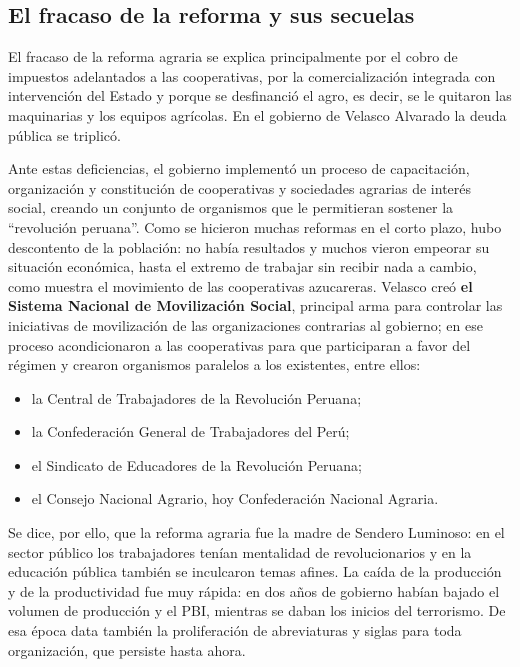 \documentclass[
  man,
  floatsintext,
  longtable,
  a4paper,
  nolmodern,
  notxfonts,
  notimes,
  12pt,
  colorlinks=true,linkcolor=blue,citecolor=blue,urlcolor=blue]{apa7}
\providecommand{\tightlist}{%
  \setlength{\itemsep}{0pt}\setlength{\parskip}{0pt}}
\begin{document}
\subsection{El fracaso de la reforma y sus
secuelas}\label{el-fracaso-de-la-reforma-y-sus-secuelas}

El fracaso de la reforma agraria se explica principalmente por el cobro
de impuestos adelantados a las cooperativas, por la comercialización
integrada con intervención del Estado y porque se desfinanció el agro,
es decir, se le quitaron las maquinarias y los equipos agrícolas. En el
gobierno de Velasco Alvarado la deuda pública se triplicó.

Ante estas deficiencias, el gobierno implementó un proceso de
capacitación, organización y constitución de cooperativas y sociedades
agrarias de interés social, creando un conjunto de organismos que le
permitieran sostener la ``revolución peruana''. Como se hicieron muchas
reformas en el corto plazo, hubo descontento de la población: no había
resultados y muchos vieron empeorar su situación económica, hasta el
extremo de trabajar sin recibir nada a cambio, como muestra el
movimiento de las cooperativas azucareras. Velasco creó \textbf{el
Sistema Nacional de Movilización Social}, principal arma para controlar
las iniciativas de movilización de las organizaciones contrarias al
gobierno; en ese proceso acondicionaron a las cooperativas para que
participaran a favor del régimen y crearon organismos paralelos a los
existentes, entre ellos:

\begin{itemize}
\tightlist
\item
  la Central de Trabajadores de la Revolución Peruana;
\item
  la Confederación General de Trabajadores del Perú;
\item
  el Sindicato de Educadores de la Revolución Peruana;
\item
  el Consejo Nacional Agrario, hoy Confederación Nacional Agraria.
\end{itemize}

Se dice, por ello, que la reforma agraria fue la madre de Sendero
Luminoso: en el sector público los trabajadores tenían mentalidad de
revolucionarios y en la educación pública también se inculcaron temas
afines. La caída de la producción y de la productividad fue muy rápida:
en dos años de gobierno habían bajado el volumen de producción y el PBI,
mientras se daban los inicios del terrorismo. De esa época data también
la proliferación de abreviaturas y siglas para toda organización, que
persiste hasta ahora.
\end{document}
